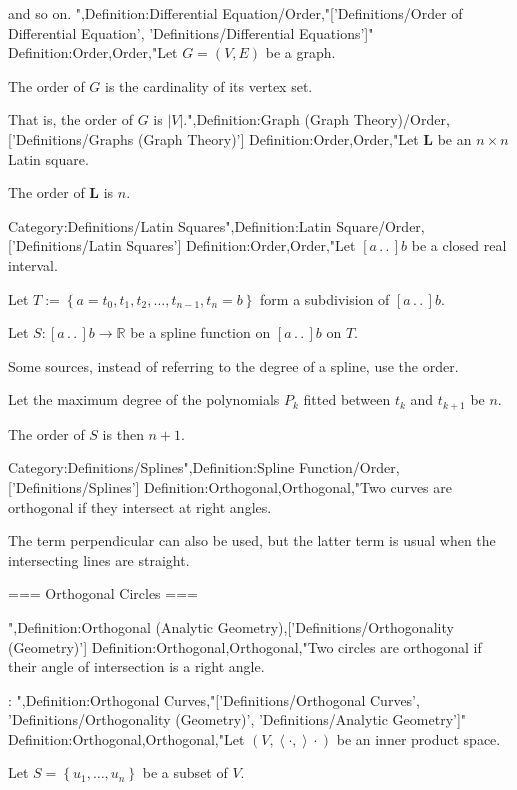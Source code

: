 and so on.
",Definition:Differential Equation/Order,"['Definitions/Order of Differential Equation', 'Definitions/Differential Equations']"
Definition:Order,Order,"Let $G = \left( V, E \right)$ be a graph.

The order of $G$ is the cardinality of its vertex set.


That is, the order of $G$ is $\left\lvert V \right\rvert$.",Definition:Graph (Graph Theory)/Order,['Definitions/Graphs (Graph Theory)']
Definition:Order,Order,"Let $\mathbf L$ be an $n \times n$ Latin square.

The order of $\mathbf L$ is $n$.


Category:Definitions/Latin Squares",Definition:Latin Square/Order,['Definitions/Latin Squares']
Definition:Order,Order,"Let $\left[ a \,.\,.\,   \right]b$ be a closed real interval.

Let $T := \left\lbrace a = t_0, t_1, t_2, \ldots, t_{n - 1}, t_n = b \right\rbrace$ form a subdivision of $\left[ a \,.\,.\,   \right]b$.

Let $S: \left[ a \,.\,.\,   \right]b \to \mathbb R$ be a spline function on $\left[ a \,.\,.\,   \right]b$ on $T$.


Some sources, instead of referring to the degree of a spline, use the order.

Let the maximum degree of the polynomials $P_k$ fitted between $t_k$ and $t_{k + 1}$ be $n$.

The order of $S$ is then $n + 1$.


Category:Definitions/Splines",Definition:Spline Function/Order,['Definitions/Splines']
Definition:Orthogonal,Orthogonal,"Two curves are orthogonal if they intersect at right angles.

The term perpendicular can also be used, but the latter term is usual when the intersecting lines are straight.


=== Orthogonal Circles ===

",Definition:Orthogonal (Analytic Geometry),['Definitions/Orthogonality (Geometry)']
Definition:Orthogonal,Orthogonal,"Two circles are orthogonal if their angle of intersection is a right angle.


:
",Definition:Orthogonal Curves,"['Definitions/Orthogonal Curves', 'Definitions/Orthogonality (Geometry)', 'Definitions/Analytic Geometry']"
Definition:Orthogonal,Orthogonal,"Let $\left( V, \left\langle \cdot,   \right\rangle\cdot \right)$ be an inner product space.

Let $S = \left\lbrace u_1, \ldots, u_n \right\rbrace$ be a subset of $V$.


